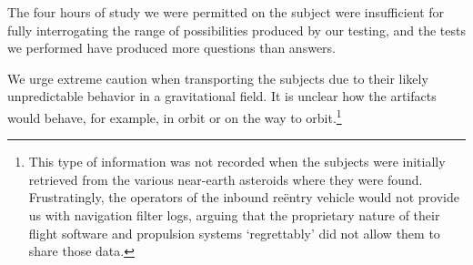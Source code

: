 \documentclass[10pt]{article}
\theoremstyle{definition}
\begin{document}
The four hours of study we were permitted on the subject were insufficient for fully interrogating the range of possibilities produced by our testing, and the tests we performed have produced more questions than answers.

We urge extreme caution when transporting the subjects due to their likely unpredictable behavior in a gravitational field.
It is unclear how the artifacts would behave, for example, in orbit or on the way to orbit.\footnote{This type of information was not recorded when the subjects were initially retrieved from the various near-earth asteroids where they were found. Frustratingly, the operators of the inbound re\"entry vehicle would not provide us with navigation filter logs, arguing that the proprietary nature of their flight software and propulsion systems `regrettably' did not allow them to share those data.}

%
%
\end{document}
